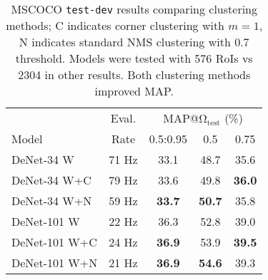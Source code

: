\documentclass[10pt,twocolumn,letterpaper]{article}
\begin{document}
\begin{table}[tb]
\begin{center}
\begin{tabular}{l|c|ccc}
 & Eval. & \multicolumn{3}{|c}{MAP@$\bm{\mathrm{\Omega_{test}}}$ (\%)}  \\
 Model & Rate &0.5:0.95 & 0.5 & 0.75  \\
\hline
DeNet-34 $\bm{\mathrm{W}}$ & 71 Hz & 33.1 & 48.7 & 35.6 \\
DeNet-34 $\bm{\mathrm{W}}$+$\bm{\mathrm{C}}$ & 79 Hz & 33.6 & 49.8 & \textbf{36.0} \\
DeNet-34 $\bm{\mathrm{W}}$+$\bm{\mathrm{N}}$ & 59 Hz & \textbf{33.7} & \textbf{50.7} & 35.8 \\
\hline
DeNet-101 $\bm{\mathrm{W}}$ & 22 Hz & 36.3 & 52.8 & 39.0 \\
DeNet-101 $\bm{\mathrm{W}}$+$\bm{\mathrm{C}}$ & 24 Hz & \textbf{36.9} & 53.9 & \textbf{39.5} \\
DeNet-101 $\bm{\mathrm{W}}$+$\bm{\mathrm{N}}$ & 21 Hz & \textbf{36.9} & \textbf{54.6} & 39.3 \\
\end{tabular}
\end{center}
\caption{MSCOCO \texttt{test-dev} results comparing clustering methods; $\bm{\mathrm{C}}$ indicates corner clustering with $m=1$, $\bm{\mathrm{N}}$ indicates standard NMS clustering with 0.7 threshold. Models were tested with 576 RoIs vs 2304 in other results. Both clustering methods improved MAP.}
\label{table:mscoco_corner_cluster}
\end{table}
\end{document}
